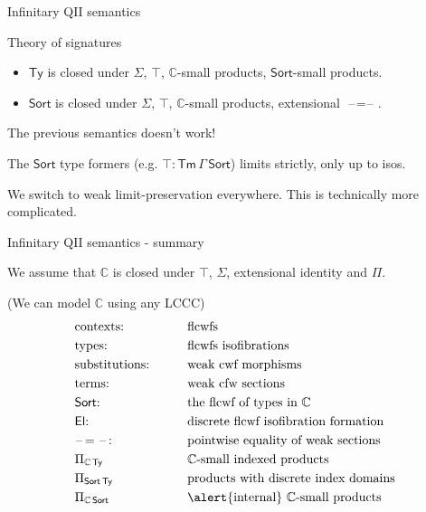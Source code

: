 \documentclass[dvipsnames]{beamer}
\newcommand{\mbb}[1]{\mathbb{#1}}
\newcommand{\Tm}{\mathsf{Tm}}
\newcommand{\Ty}{\mathsf{Ty}}
\newcommand{\El}{\mathsf{El}}
\newcommand{\blank}{\mathord{\hspace{1pt}\text{--}\hspace{1pt}}}
\newcommand{\Sort}{\mathsf{Sort}}
\newcommand{\mbbC}{\mbb{C}}
\begin{document}
\begin{frame}{Infinitary QII semantics}

\begin{block}{Theory of signatures}
  \begin{itemize}
    \item $\Ty$ is closed under $\Sigma$, $\top$, $\mbbC$-small products, $\Sort$-small products.
    \item $\Sort$ is closed under $\Sigma$, $\top$, $\mbbC$-small products, extensional $\blank\!=\!\blank$.
  \end{itemize}
\end{block}

The previous semantics doesn't work!
\vspace{1em}

The $\Sort$ type formers (e.g. $\top : \Tm\,\Gamma\,\Sort$)
 limits strictly, only up to isos.
\vspace{1em}

We switch to weak limit-preservation everywhere. This is technically more complicated.
\vspace{1em}

\end{frame}

\begin{frame}{Infinitary QII semantics - summary}

We assume that $\mbbC$ is closed under $\top$, $\Sigma$, extensional identity
and \alert{$\Pi$}.

\vspace{1em}

(We can model $\mbbC$ using any LCCC)
\begin{alignat*}{3}
  & \text{contexts:}                  && \text{flcwfs}\\
  & \text{types:}                     && \text{flcwfs isofibrations}\\
  & \text{substitutions:}\hspace{2em} && \text{weak cwf morphisms}\\
  & \text{terms:}                     && \text{weak cfw sections}\\
  & \text{$\Sort$:}                   && \text{the flcwf of types in $\mbbC$}\\
  & \text{$\El$:}                     && \text{discrete flcwf isofibration formation}\\
  & \blank\!=\blank\!:                && \text{pointwise equality of weak sections}\\
  & \Pi_{\mbbC\,\Ty}                    && \text{$\mbbC$-small indexed products}\\
  & \Pi_{\Sort\,\Ty}                    && \text{products with discrete index domains}\\
  & \Pi_{\mbbC\,\Sort}                  && \text{\alert{internal} $\mbbC$-small products}\\
\end{alignat*}

\end{frame}
\end{document}
